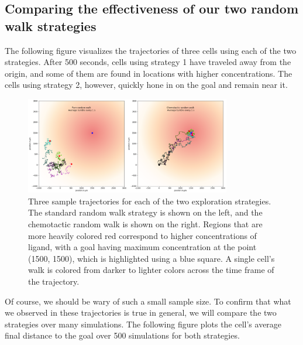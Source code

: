 \subsection{Comparing the effectiveness of our two random walk strategies}

The following figure visualizes the trajectories of three cells using each of the two strategies. After 500 seconds, cells using strategy 1 have traveled away from the origin, and some of them are found in locations with higher concentrations. The cells using strategy 2, however, quickly hone in on the goal and remain near it.

\begin{figure}[h]
\centering
\mySfFamily
\includegraphics[width = 0.8\textwidth]{../images/chemotaxis_traj_compare_uniform.png}
\caption{Three sample trajectories for each of the two exploration strategies. The standard random walk strategy is shown on the left, and the chemotactic random walk is shown on the right. Regions that are more heavily colored red correspond to higher concentrations of ligand, with a goal having maximum concentration at the point (1500, 1500), which is highlighted using a blue square. A single cell's walk is colored from darker to lighter colors across the time frame of the trajectory.}
\label{fig:chemotaxis_traj_compare_uniform}
\end{figure}


Of course, we should be wary of such a small sample size. To confirm that what we observed in these trajectories is true in general, we will compare the two strategies over many simulations. The following figure plots the cell's average final distance to the goal over 500 simulations for both strategies.

